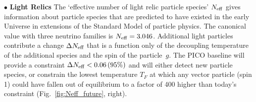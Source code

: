 \documentclass[PICOAPC.tex]{subfiles}
\begin{document}
$\bullet$ {\bf Light Relics} \hspace{0.1in} The `effective number of light relic particle species' ${N_{\rm eff}}$ gives information about particle species that are predicted to have existed in the early Universe in extensions of the Standard Model of particle physics. The canonical value with three neutrino families is ${N_{\rm eff}} = 3.046$. Additional light particles contribute a change $\Delta {N_{\rm eff}}$ that is a function only of the decoupling temperature of the additional species and the spin of the particle~$g$. The PICO {\comred baseline} will provide a constraint $\Delta {N_{\rm eff}} < 0.06 \, (95\%)$ and will either detect new particle species, or constrain the lowest temperature $T_{F}$ at which any %
vector particle (spin 1) could have fallen out of equilibrium to a factor of 400 higher than today's constraint (Fig.~\ref{fig:Neff_future}, right). 




\end{document}
